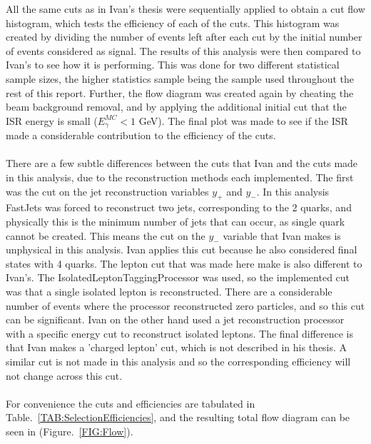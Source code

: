 All the same cuts as in Ivan’s thesis \cite{IvanMarchesini} were sequentially applied to obtain a cut flow histogram, which tests the efficiency of each of the cuts. This histogram was created by dividing the number of events left after each cut by the initial number of events considered as signal. The results of this analysis were then compared to Ivan's to see how it is performing. This was done for two different statistical sample sizes, the higher statistics sample being the sample used throughout the rest of this report. Further, the flow diagram was created again by cheating the beam background removal, and by applying the additional initial cut that the ISR energy is small (${E}_{\gamma}^{MC} < 1$ GeV). The final plot was made to see if the ISR made a considerable contribution to the efficiency of the cuts.
\\\\
There are a few subtle differences between the cuts that Ivan and the cuts made in this analysis, due to the reconstruction methods each implemented. The first was the cut on the jet reconstruction variables ${y}_{+}$ and ${y}_{-}$. In this analysis FastJets was forced to reconstruct two jets, corresponding to the 2 quarks, and physically this is the minimum number of jets that can occur, as single quark cannot be created. This means the cut on the ${y}_{-}$ variable that Ivan makes is unphysical in this analysis. Ivan applies this cut because he also considered final states with 4 quarks. The lepton cut that was made here make is also different to Ivan’s. The IsolatedLeptonTaggingProcessor was used, so the implemented cut was that a single isolated lepton is reconstructed. There are a considerable number of events where the processor reconstructed zero particles, and so this cut can be significant. Ivan on the other hand used a jet reconstruction processor with a specific energy cut to reconstruct isolated leptons. The final difference is that Ivan makes a 'charged lepton' cut, which is not described in his thesis. A similar cut is not made in this analysis and so the corresponding efficiency will not change across this cut.
\\\\
For convenience the cuts and efficiencies are tabulated in Table.~\ref{TAB:SelectionEfficiencies}, and the resulting total flow diagram can be seen in (Figure.~\ref{FIG:Flow}).
\\\\

